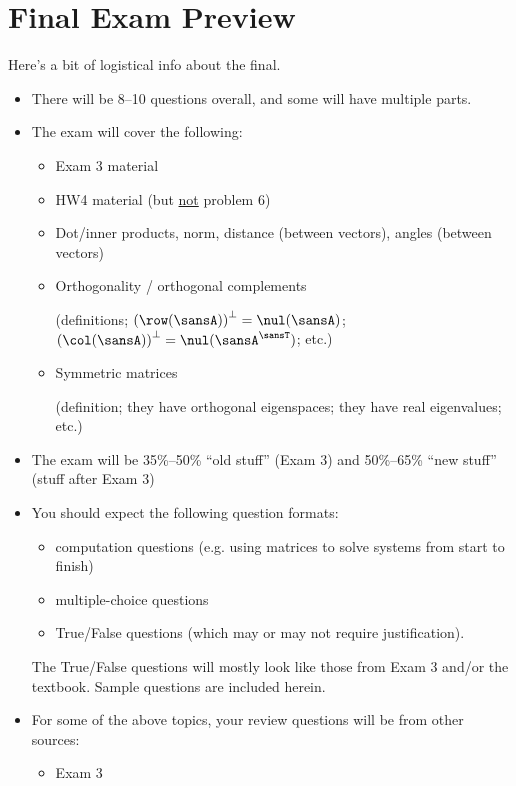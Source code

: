 \documentclass[12pt]{article}
\begin{document}
	\section*{\centering Final Exam Preview}
	
	\noindent Here's a bit of logistical info about the final.
	\begin{itemize}[topsep=0.125in,itemsep=0.625mm]
		\item There will be 8--10 questions overall, and some will have multiple parts.
		\item The exam will cover the following: 
		\begin{itemize}[topsep=0mm,listparindent=6mm]	
			\item Exam 3 material
			
			\item HW4 material (but \ul{not} problem 6)
			\item Dot/inner products, norm, distance (between vectors), angles (between vectors)
			\item Orthogonality / orthogonal complements 
			
			(definitions; $\left(\row(\sansA)\right)^\perp=\nul(\sansA)$;  $\left(\col(\sansA)\right)^\perp=\nul(\sansA^\sansT)$; etc.)
			\item Symmetric matrices 
			
			(definition; they have orthogonal eigenspaces; they have real eigenvalues; etc.)
		\end{itemize}
		\item The exam will be 35\%--50\% ``old stuff'' (Exam 3) and 50\%--65\% ``new stuff'' (stuff after Exam 3)
		\item You should expect the following question formats:
		\begin{itemize}[topsep=0mm]
			\item computation questions (e.g. using matrices to solve systems from start to finish)
			\item multiple-choice questions
			\item True/False questions (which may or may not require justification).
		\end{itemize}
		The True/False questions will mostly look like those from Exam 3 and/or the textbook. Sample questions are included herein. %
		\item For some of the above topics, your review questions will be from other sources:
		\begin{itemize}[topsep=0mm,listparindent=6mm]
			\item Exam 3
			

\end{itemize}
\end{itemize}
\end{document}
